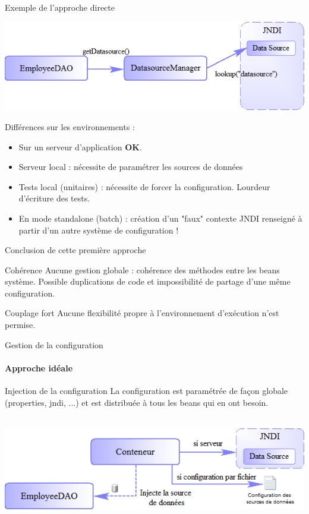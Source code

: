 \documentclass[compress]{beamer}%
\begin{document}
\begin{frame}{Exemple de l'approche directe}

	\includegraphics[width=\textwidth]{images/spring_datasource_without.png}
	
	\pause
	Différences sur les environnements :
	\begin{itemize}[<+->]
	\item Sur un serveur d'application \textbf{OK}.
	\item Serveur local : nécessite de paramétrer les sources de données
	\item Tests local (unitaires) : nécessite de forcer la configuration. Lourdeur d'écriture des tests.
	\item En mode standalone (batch) : création d'un "faux" contexte JNDI renseigné à partir d'un autre système de configuration !
	\end{itemize}
	
	
\end{frame}

\begin{frame}{Conclusion de cette première approche}
	
	\begin{alertblock}{Cohérence}
	Aucune gestion globale : cohérence des méthodes entre les beans système. Possible duplications de code et impossibilité de partage d'une même configuration.%
	\end{alertblock}
	
	\pause
	\begin{alertblock}{Couplage fort}
	Aucune flexibilité propre à l'environnement d'exécution n'est permise.
	\end{alertblock}
\end{frame}

\begin{frame}{Gestion de la configuration}
	\framesubtitle{Approche idéale}
	
	\begin{block}{Injection de la configuration}
	La configuration est paramétrée de façon globale (properties, jndi, ...) et est distribuée à tous les beans qui en ont besoin.
	\end{block}
	~\\
	
	\pause	
	\includegraphics[width=\textwidth]{images/spring_datasource_with.png}
\end{frame}
\end{document}

